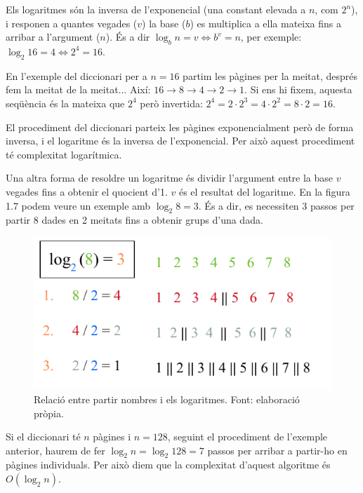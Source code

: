 Els logaritmes són la inversa de l'exponencial (una constant elevada a $n$, com $2^n$), i responen a quantes vegades ($v$) la base ($b$) es multiplica a ella mateixa fins a arribar a l'argument ($n$). És a dir $\log_b{n} = v \iff b^v = n$, per exemple: $\log_2{16} = 4 \iff 2^4 = 16$. 

En l'exemple del diccionari per a $n = 16$ partim les pàgines per la meitat, després fem la meitat de la meitat... Així: $16 \rightarrow 8 \rightarrow 4 \rightarrow 2 \rightarrow 1$. Si ens hi fixem, aquesta seqüència és la mateixa que $2^4$ però invertida: $2^4 = 2 \cdot 2^3 = 4 \cdot 2^2 = 8 \cdot 2 = 16$. 

El procediment del diccionari parteix les pàgines exponencialment però de forma inversa, i el logaritme és la inversa de l'exponencial. Per això aquest procediment té complexitat logarítmica.

Una altra forma de resoldre un logaritme és dividir l'argument entre la base $v$ vegades fins a obtenir el quocient d'1. $v$ és el resultat del logaritme. En la figura 1.7 podem veure un exemple amb $\log_2{8} = 3$. És a dir, es necessiten 3 passos per partir 8 dades en 2 meitats fins a obtenir grups d'una dada.
\begin{figure}[H]
    \centering
    \includegraphics[width=.4\textwidth]{capitols/figures/log (4).pdf}
    \caption[Relació entre partir nombres i els logaritmes.]{Relació entre partir nombres i els logaritmes. Font: elaboració pròpia.}
    \label{fig:my_label}
\end{figure}
Si el diccionari té $n$ pàgines i $n = 128$, seguint el procediment de l'exemple anterior, haurem de fer $\log_2{n} = \log_2{128} = 7$ passos per arribar a partir-ho en pàgines individuals.  Per això diem que la complexitat d'aquest algoritme és $O(\log_2{n})$.

